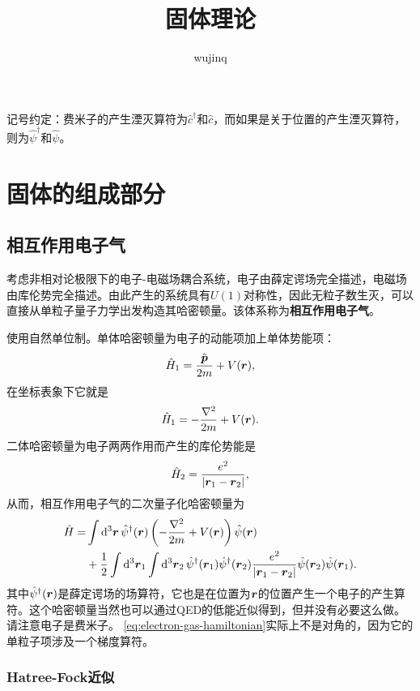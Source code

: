 \documentclass[hyperref, UTF8, a4paper]{ctexart}
\title{固体理论}
\author{wujinq}
\begin{document}
\maketitle

记号约定：费米子的产生湮灭算符为$\hat{c}^\dagger$和$\hat{c}$，而如果是关于位置的产生湮灭算符，则为$\hat{\psi}^\dagger$和$\hat{\psi}$。

\section{固体的组成部分}

\subsection{相互作用电子气}

考虑非相对论极限下的电子-电磁场耦合系统，电子由薛定谔场完全描述，电磁场由库伦势完全描述。由此产生的系统具有$U(1)$对称性，因此无粒子数生灭，可以直接从单粒子量子力学出发构造其哈密顿量。该体系称为\textbf{相互作用电子气}。

使用自然单位制。单体哈密顿量为电子的动能项加上单体势能项：
\[
    \hat{H}_1 = \frac{\hat{\vb*{p}}}{2m} + V(\vb*{r}),
\]
在坐标表象下它就是
\[
    \hat{H}_1 = - \frac{\laplacian}{2m} + V(\vb*{r}).
\]
二体哈密顿量为电子两两作用而产生的库伦势能是
\[
    \hat{H}_2 = \frac{e^2}{\abs{\vb*{r}_1 - \vb*{r}_2}},
\]
从而，相互作用电子气的二次量子化哈密顿量为
\begin{equation}
    \begin{aligned}
        \hat{H} = &\int \dd[3]{\vb*{r}} \hat{\psi}^\dagger(\vb*{r}) \left( - \frac{\laplacian}{2m} + V(\vb*{r}) \right) \hat{\psi}(\vb*{r}) \\
        &+ \frac{1}{2} \int \dd[3]{\vb*{r}_1} \int \dd[3]{\vb*{r}_2} \hat{\psi}^\dagger (\vb*{r}_1) \hat{\psi}^\dagger (\vb*{r}_2) \frac{e^2}{\abs{\vb*{r}_1 - \vb*{r}_2}} \hat{\psi} (\vb*{r}_2) \hat{\psi}(\vb*{r}_1). 
        \label{eq:electron-gas-hamiltonian}
    \end{aligned}
\end{equation}
其中$\hat{\psi}^\dagger(\vb*{r})$是薛定谔场的场算符，它也是在位置为$\vb*{r}$的位置产生一个电子的产生算符。这个哈密顿量当然也可以通过QED的低能近似得到，但并没有必要这么做。请注意电子是费米子。
\eqref{eq:electron-gas-hamiltonian}实际上不是对角的，因为它的单粒子项涉及一个梯度算符。

\subsubsection{Hatree-Fock近似}
\end{document}
